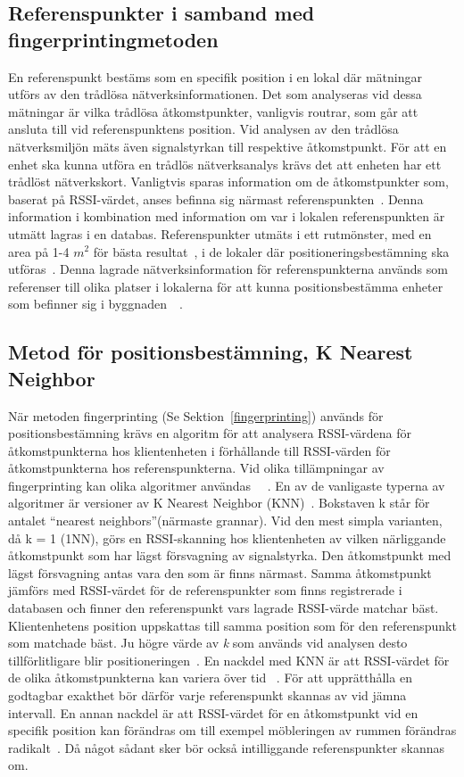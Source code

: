 \documentclass[a4paper,12pt]{article}
\begin{document}
 \subsection{Referenspunkter i samband med fingerprintingmetoden}\label{referenspunkter}
 En referenspunkt bestäms som en specifik position i en lokal där mätningar utförs av den trådlösa nätverksinformationen. Det som analyseras vid dessa mätningar är vilka trådlösa åtkomstpunkter, vanligvis routrar, som går att ansluta till vid referenspunktens position. Vid analysen av den trådlösa nätverksmiljön mäts även signalstyrkan till respektive åtkomstpunkt. För att en enhet ska kunna utföra en trådlös nätverksanalys krävs det att enheten har ett trådlöst nätverkskort. Vanligtvis sparas information om de åtkomstpunkter som, baserat på RSSI-värdet, anses befinna sig närmast referenspunkten~\cite{IP1}. Denna information i kombination med information om var i lokalen referenspunkten är utmätt lagras i en databas. Referenspunkter utmäts i ett rutmönster, med en area på 1-4 $m^2$ för bästa resultat~\cite{yiu2017wireless}, i de lokaler där positioneringsbestämning ska utföras~\cite{IP1}. Denna lagrade nätverksinformation för referenspunkterna används som referenser till olika platser i lokalerna för att kunna positionsbestämma enheter som befinner sig i byggnaden~\cite{yiu2017wireless}~\cite{IP1}.


 \subsection{Metod för positionsbestämning, K Nearest Neighbor}\label{KNN}
 När metoden fingerprinting (Se Sektion~\ref{fingerprinting}) används för positionsbestämning krävs en algoritm för att analysera RSSI-värdena för åtkomstpunkterna hos klientenheten i förhållande till RSSI-värden för åtkomstpunkterna hos referenspunkterna. Vid olika tillämpningar av fingerprinting kan olika algoritmer användas ~\cite{tian2013fingerprint}~\cite{jun2018low}. En av de vanligaste typerna av algoritmer är versioner av K Nearest Neighbor (KNN)~\cite{tian2013fingerprint}.
 Bokstaven k står för antalet ``nearest neighbors''(närmaste grannar). Vid den mest simpla varianten, då k = 1 (1NN), görs en RSSI-skanning hos klientenheten av vilken närliggande åtkomstpunkt som har lägst försvagning av signalstyrka. Den åtkomstpunkt med lägst försvagning antas vara den som är finns närmast. Samma åtkomstpunkt jämförs med RSSI-värdet för de referenspunkter som finns registrerade i databasen och finner den referenspunkt vars lagrade RSSI-värde matchar bäst. Klientenhetens position uppskattas till samma position som för den referenspunkt som matchade bäst.
 Ju högre värde av \textit{k} som används vid analysen desto tillförlitligare blir positioneringen~\cite{yiu2017wireless}.
 En nackdel med KNN är att RSSI-värdet för de olika åtkomstpunkterna kan variera över tid ~\cite{tian2013fingerprint}. För att upprätthålla en godtagbar exakthet bör därför varje referenspunkt skannas av vid jämna intervall.
 En annan nackdel är att RSSI-värdet för en åtkomstpunkt vid en specifik position kan förändras om till exempel möbleringen av rummen förändras radikalt~\cite{zanca2008experimental}. Då något sådant sker bör också intilliggande referenspunkter skannas om.
\end{document}

